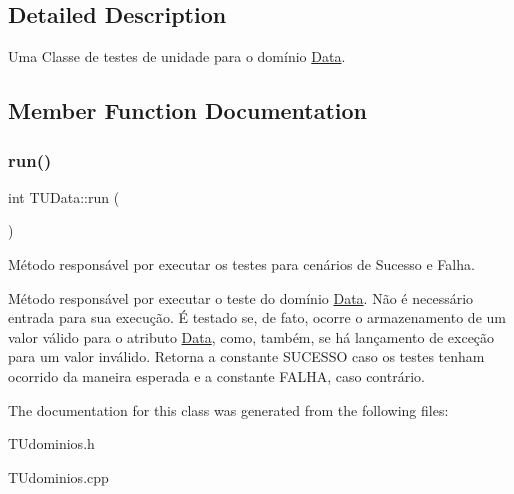\subsection{Detailed Description}
Uma Classe de testes de unidade para o domínio \hyperlink{classData}{Data}. 

\subsection{Member Function Documentation}
\mbox{\label{classTUData_a4fd95b821fa6d55bdc82be6f3a3cbef2}} 
\subsubsection{\texorpdfstring{run()}{run()}}
{\footnotesize\ttfamily int T\+U\+Data\+::run (\begin{DoxyParamCaption}{ }\end{DoxyParamCaption})}



Método responsável por executar os testes para cenários de Sucesso e Falha. 

Método responsável por executar o teste do domínio \hyperlink{classData}{Data}. Não é necessário entrada para sua execução. É testado se, de fato, ocorre o armazenamento de um valor válido para o atributo \hyperlink{classData}{Data}, como, também, se há lançamento de exceção para um valor inválido. Retorna a constante S\+U\+C\+E\+S\+SO caso os testes tenham ocorrido da maneira esperada e a constante F\+A\+L\+HA, caso contrário. 

The documentation for this class was generated from the following files\+:\begin{DoxyCompactItemize}
\item 
T\+Udominios.\+h\item 
T\+Udominios.\+cpp\end{DoxyCompactItemize}
